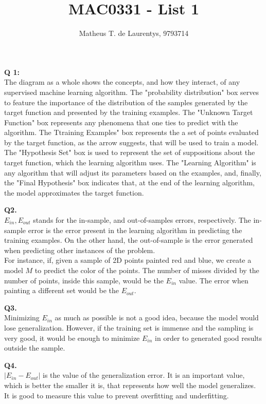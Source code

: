 \documentclass[]{article}
\title{\vspace{-4.0cm}MAC0331 - List 1}
\author{Matheus T. de Laurentys, 9793714}
\begin{document}
	\maketitle
	\noindent
	\textbf{Q 1:} \\
	The diagram as a whole shows the concepts, and how they interact, of any supervised machine learning algorithm. The "probability distribution" box serves to feature the importance of the distribution of the samples generated by the target function and presented by the training examples. The "Unknown Target Function" box represents any phenomena that one ties to predict with the algorithm. The Ttraining Examples" box represents the a set of points evaluated by the target function, as the arrow suggests, that will be used to train a model. The "Hypothesis Set" box is used to represent the set of suppositions about the target function, which the learning algorithm uses. The "Learning Algorithm" is any algorithm that will adjust its parameters based on the examples, and, finally, the "Final Hypothesis" box indicates that, at the end of the learning algorithm, the model approximates the target function.
	
	\noindent
	\textbf{Q2.}\\
	$E_{in}, E_{out}$ stands for the in-sample, and out-of-samples errors, respectively. The in-sample error is the error present in the learning algorithm in predicting the training examples. On the other hand, the out-of-sample is the error generated when predicting other instances of the problem.\\
	For instance, if, given a sample of 2D points painted red and blue, we create a model $M$ to predict the color of the points. The number of misses divided by the number of points, inside this sample, would be the $E_{in}$ value. The error when painting a different set would be the $E_{out}$.
	
	\noindent
	\textbf{Q3.}\\
	Minimizing $E_{in}$ as much as possible is not a good idea, because the model would lose generalization. However, if the training set is immense and the sampling is very good, it would be enough to minimize $E_{in}$ in order to generated good results outside the sample.
	
	\noindent
	\textbf{Q4.}\\
	$|E_{in} - E_{out}|$ is the value of the generalization error. It is an important value, which is better the smaller it is, that represents how well the model generalizes. It is good to measure this value to prevent overfitting and underfitting.
	
\end{document}
